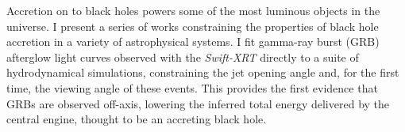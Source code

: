 %


Accretion on to black holes powers some of the most luminous objects in the universe.  I present a series of works constraining the properties of black hole accretion in a variety of astrophysical systems.  I fit gamma-ray burst (GRB) afterglow light curves observed with the \emph{Swift-XRT} directly to a suite of hydrodynamical simulations, constraining the jet opening angle and, for the first time, the viewing angle of these events.  This provides the first evidence that GRBs are observed off-axis, lowering the inferred total energy delivered by the central engine, thought to be an accreting black hole.


